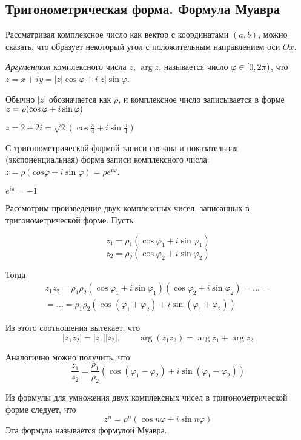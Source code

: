 \subsection{Тригонометрическая форма. Формула Муавра}

Рассматривая комплексное число как вектор с координатами $(a,b)$, можно сказать, что образует некоторый угол с положительным направлением оси $Ox$.

\begin{df}
\emph{Аргументом} комплексного числа $z$, $\arg z$, называется число $\varphi\bw\in[0,2\pi)$, что $z = x+iy = |z|\cos\varphi+i|z|\sin\varphi$.
\end{df}

Обычно $|z|$ обозначается как $\rho$, и комплексное число записывается в форме $z =\bw \rho(\cos\varphi+i\sin\varphi)$

\begin{ex}
$z = 2+2i = \sqrt{2}( \cos{\frac{\pi}{4}} + i\sin{\frac{\pi}{4}} )$
\end{ex}

С тригонометрической формой записи связана и показательная (экспоненциальная) форма записи комплексного числа: $z = \rho(cos\varphi+i\sin\varphi) = \rho e^{i\varphi}$.

\begin{ex}$e^{i\pi} = -1$\end{ex}

Рассмотрим произведение двух комплексных чисел, записанных в тригонометрической форме. Пусть 

$$z_1 = \rho_1(\cos{\varphi_1}+i\sin{\varphi_1})$$
$$z_2 = \rho_2(\cos{\varphi_2}+i\sin{\varphi_2})$$

Тогда
\begin{multline*}z_1z_2 = \rho_1\rho_2(\cos{\varphi_1}+i\sin{\varphi_1})(\cos{\varphi_2}+i\sin{\varphi_2}) = \dots=\\ =\dots= \rho_1\rho_2\left(\cos(\varphi_1+\varphi_2)+i\sin(\varphi_1+\varphi_2)\right)\end{multline*}

Из этого соотношения вытекает, что 
$$|z_1z_2|=|z_1||z_2|,\qquad\arg(z_1z_2)=\arg z_1+\arg z_2$$

Аналогично можно получить, что 
$$ \frac{z_1}{z_2} = \frac{\rho_1}{\rho_2}\left(\cos(\varphi_1-\varphi_2)+i\sin(\varphi_1-\varphi_2)\right)$$

\begin{stm}
Из формулы для умножения двух комплексных чисел в тригонометрической форме следует, что
$$z^n=\rho^n(\cos n\varphi+i\sin n\varphi)$$
Эта формула называется формулой Муавра.
\end{stm}

